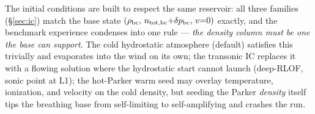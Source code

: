 \documentclass[english,a4paper]{kiseon_memo}
\begin{document}
The initial conditions are built to respect the same reservoir: all
three families (\S\ref{sec:ic}) match the base state
$(\rho_{\rm bc},\, n_{\rm tot,bc}{+}\delta p_{\rm bc},\, v{=}0)$ exactly, and the
benchmark experience condenses into one rule --- \emph{the density
column must be one the base can support}. The cold hydrostatic
atmosphere (default) satisfies this trivially and evaporates into the
wind on its own; the transonic IC replaces it with a flowing solution
where the hydrostatic start cannot launch (deep-RLOF, sonic point at
L1); the hot-Parker warm seed may overlay temperature, ionization, and
velocity on the cold density, but seeding the Parker \emph{density}
itself tips the breathing base from self-limiting to self-amplifying
and crashes the run.
\end{document}
